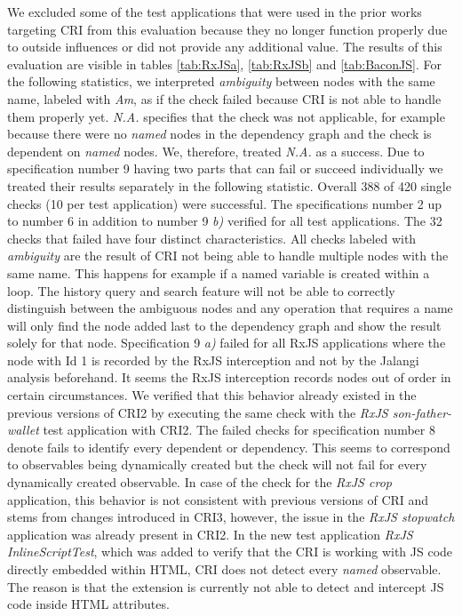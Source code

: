 We excluded some of the test applications that were used in the prior works targeting CRI from this evaluation because they no longer function properly due to outside influences or did not provide any additional value. The results of this evaluation are visible in tables \ref{tab:RxJSa}, \ref{tab:RxJSb} and \ref{tab:BaconJS}. For the following statistics, we interpreted \emph{ambiguity} between nodes with the same name, labeled with \emph{Am}, as if the check failed because CRI is not able to handle them properly yet. \emph{N.A.} specifies that the check was not applicable, for example because there were no \emph{named} nodes in the dependency graph and the check is dependent on \emph{named} nodes. We, therefore, treated \emph{N.A.} as a success. Due to specification number 9 having two parts that can fail or succeed individually we treated their results separately in the following statistic. Overall 388 of 420 single checks (10 per test application) were successful. The specifications number 2 up to number 6 in addition to number 9 \emph{b)} verified for all test applications. The 32 checks that failed have four distinct characteristics. All checks labeled with \emph{ambiguity} are the result of CRI not being able to handle multiple nodes with the same name. This happens for example if a named variable is created within a loop. The history query and search feature will not be able to correctly distinguish between the ambiguous nodes and any operation that requires a name will only find the node added last to the dependency graph and show the result solely for that node. Specification 9 \emph{a)} failed for all RxJS applications where the node with Id 1 is recorded by the RxJS interception and not by the Jalangi analysis beforehand. It seems the RxJS interception records nodes out of order in certain circumstances. We verified that this behavior already existed in the previous versions of CRI2 by executing the same check with the \emph{RxJS son-father-wallet} test application with CRI2. The failed checks for specification number 8 denote fails to identify every dependent or dependency. This seems to correspond to observables being dynamically created but the check will not fail for every dynamically created observable. In case of the check for the \emph{RxJS crop} application, this behavior is not consistent with previous versions of CRI and stems from changes introduced in CRI3, however, the issue in the \emph{RxJS stopwatch} application was already present in CRI2.
In the new test application \emph{RxJS InlineScriptTest}, which was added to verify that the CRI is working with JS code directly embedded within HTML, CRI does not detect every \emph{named} observable. The reason is that the extension is currently not able to detect and intercept JS code inside HTML attributes.
